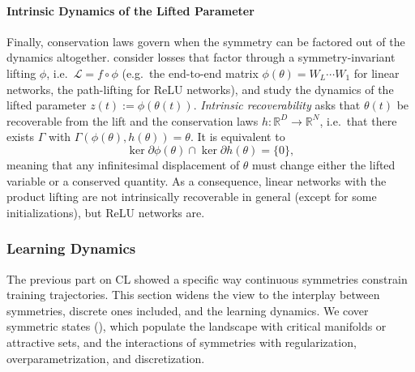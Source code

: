 \documentclass[mathematics,review,submit,moreauthors]{Definitions/mdpi}
\begin{document}
\paragraph{Intrinsic Dynamics of the Lifted Parameter}
Finally, conservation laws govern when the symmetry can be factored out of the dynamics altogether.
\citet{marcotte2026} consider losses that factor through a symmetry-invariant lifting $\phi$, i.e.\ $\mathcal{L}=f\circ\phi$ (e.g.\ the end-to-end matrix $\phi(\theta)=W_L\cdots W_1$ for linear networks, the path-lifting for ReLU networks), and study the dynamics of the lifted parameter $z(t):=\phi(\theta(t))$.
\emph{Intrinsic recoverability} asks that $\theta(t)$ be recoverable from the lift and the conservation laws $h:\mathbb{R}^D\to\mathbb{R}^N$, i.e.\ that there exists $\Gamma$ with $\Gamma(\phi(\theta),h(\theta))=\theta$.
It is equivalent to
\begin{equation*}
    \ker\partial\phi(\theta)\cap\ker\partial h(\theta)=\{0\},
\end{equation*}
meaning that any infinitesimal displacement of $\theta$ must change either the lifted variable or a conserved quantity.
As a consequence, linear networks with the product lifting are not intrinsically recoverable in general (except for some initializations), but ReLU networks are.

\subsubsection{Learning Dynamics}\label{sec:learning-dynamics}
The previous part on CL showed a specific way continuous symmetries constrain training trajectories.
This section widens the view to the interplay between symmetries, discrete ones included, and the learning dynamics.
We cover symmetric states (), which populate the landscape with critical manifolds or attractive sets, and the interactions of symmetries with regularization, overparametrization, and discretization.
\end{document}
